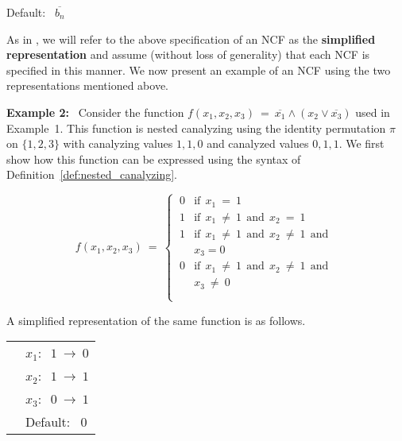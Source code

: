 \noindent
\hspace*{0.5in} Default:~ $\overline{b_n}$

\medskip
\noindent
As in \cite{Stearns-etal-2018}, we will refer to the above specification
of an NCF as the \textbf{simplified representation} and assume
(without loss of generality) that each NCF is specified in this manner.
We now present an example of an NCF using the two representations
mentioned above.


\medskip
\noindent
\textbf{Example 2:}~ Consider the function 
$f(x_1, x_2, x_3) ~=~ \overline{x_1} \wedge (x_2 \vee \overline{x_3})$
used in Example~1.
This function is nested canalyzing using the identity permutation $\pi$ on $\{1,2,3\}$
with canalyzing values $1,1,0$ and canalyzed values $0, 1, 1$.
We first show how this function can be expressed using the syntax of
Definition~\ref{def:nested_canalyzing}.

\[
f(x_1, x_2, x_3) ~=~ 
   \begin{cases}
       \:0 & \mathrm{if~~} x_{1} ~=~ 1 \\
       \:1 & \mathrm{if~~} x_{1} ~\neq~ 1 \mathrm{~~and~~}
            x_{2} ~=~ 1 \\
       \:1 & \mathrm{if~~} x_{1} ~\neq~ 1 \mathrm{~~and~~}
            x_{2} ~\neq~ 1 \mathrm{~~and~~}\\ 
           &x_{3} = 0 \\
       \:0 & \mathrm{if~~} x_{1} ~\neq~ 1 \mathrm{~~and~~} 
             x_{2} ~\neq~ 1 \mathrm{~~and~~}\\ 
           & x_{3} ~\neq~ 0 \\ \\ 
   \end{cases}
\]

\medskip
\noindent
A simplified representation of the same function is as follows.

\bigskip

\noindent
\begin{tabular}{ll}
\hspace*{0.25in} & $x_1:~$  $1 ~\longrightarrow~ 0$ \\ [0.5ex]
\hspace*{0.25in} & $x_2:~$  $1 ~\longrightarrow~ 1$ \\ [0.5ex]
\hspace*{0.25in} & $x_3:~$  $0 ~\longrightarrow~ 1$ \\ [0.5ex]
\hspace*{0.25in} & Default:~ $0$ \\
\end{tabular}

